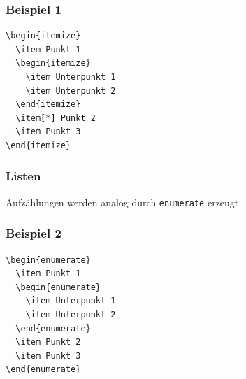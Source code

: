\begin{frame}[fragile,t]
\frametitle{Beispiel 1}\vspace{-10pt}
\begin{lstlisting}[style=Latex]
\begin{itemize}
  \item Punkt 1
  \begin{itemize}
    \item Unterpunkt 1
    \item Unterpunkt 2
  \end{itemize}
  \item[*] Punkt 2
  \item Punkt 3
\end{itemize}
\end{lstlisting}
\pause\vspace{-25pt}
\end{frame}
\begin{frame}[fragile]
\frametitle{Listen}
Aufzählungen werden analog durch \texttt{enumerate} erzeugt.
\end{frame}
\begin{frame}[fragile,t]
\frametitle{Beispiel 2}\vspace{-10pt}
\begin{lstlisting}[style=Latex]
\begin{enumerate}
  \item Punkt 1
  \begin{enumerate}
    \item Unterpunkt 1
    \item Unterpunkt 2
  \end{enumerate}
  \item Punkt 2
  \item Punkt 3
\end{enumerate}
\end{lstlisting} 
\pause\vspace{-25pt}
\end{frame}
